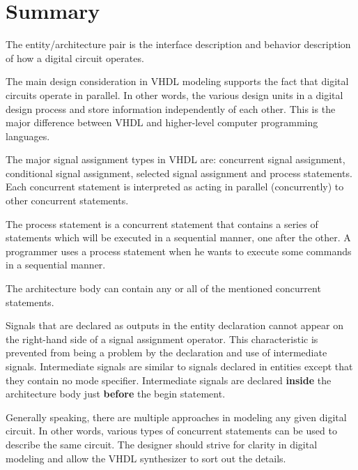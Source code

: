\section{Summary} 
\begin{my_list}
\item The entity/architecture pair is the interface description and behavior description of how a digital circuit operates.
\item The main design consideration in VHDL modeling supports the fact that digital circuits operate in parallel. In other words, the various design units in a digital design process and store information independently of each other. This is the major difference between VHDL and higher-level computer programming languages.
\item The major signal assignment types in VHDL are: concurrent signal assignment, conditional signal assignment, selected signal assignment and process statements. Each concurrent statement is interpreted as acting in parallel (concurrently) to other concurrent statements.
\item The process statement is a concurrent statement that contains a series of statements which will be executed in a sequential manner, one after the other. A programmer uses a process statement when he wants to execute some commands in a sequential manner.
\item The architecture body can contain any or all of the mentioned concurrent statements.
\item Signals that are declared as outputs in the entity declaration cannot appear on the right-hand side of a signal assignment operator. This characteristic is prevented from being a problem by the declaration and use of intermediate signals. Intermediate signals are similar to signals declared in entities except that they contain no mode specifier. Intermediate signals are declared \textbf{inside} the architecture body just \textbf{before} the begin statement.
\item Generally speaking, there are multiple approaches in modeling any given digital circuit. In other words, various types of concurrent statements can be used to describe the same circuit. The designer should strive for clarity in digital modeling and allow the VHDL synthesizer to sort out the details.
\end{my_list}

